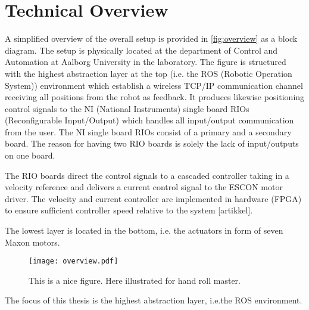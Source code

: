 \section{Technical Overview}
A simplified overview of the overall setup is provided in \autoref{fig:overview} as a block diagram. The setup is physically located at the department of Control and Automation at Aalborg University in the laboratory. The figure is structured with the highest abstraction layer at the top (i.e. the ROS (Robotic Operation System)) environment which establish a wireless TCP/IP communication channel receiving all positions from the robot as feedback. It produces likewise positioning control signals to the NI (National Instruments) single board RIOs (Reconfigurable Input/Output) which handles all input/output communication from the user. The NI single board RIOs consist of a primary and a secondary board. The reason for having two RIO boards is solely the lack of input/outputs on one board.

The RIO boards direct the control signals to a cascaded controller taking in a velocity reference and delivers a current control signal to the ESCON motor driver. The velocity and current controller are implemented in hardware (FPGA) to ensure sufficient controller speed relative to the system [artikkel]. 

The lowest layer is located in the bottom, i.e. the actuators in form of seven Maxon motors. 
\begin{figure}[H]
	\center
	\texttt{[image: overview.pdf]}	\caption{This is a nice figure. Here illustrated for hand roll master.}
	\label{fig:overview}
\end{figure}
The focus of this thesis is the highest abstraction layer, i.e.the ROS environment.
